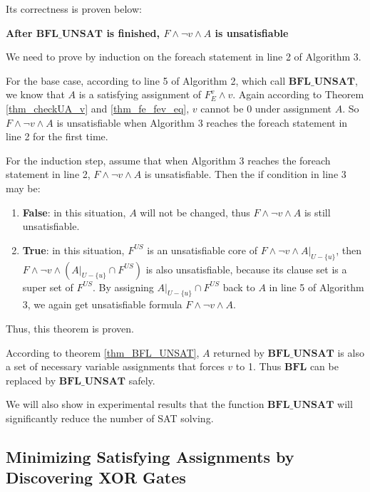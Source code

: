 \documentclass[journal]{IEEEtran}
\begin{document}
Its correctness is proven below:
\vspace{0.2cm}
\begin{theorem}[]\label{thm_BFL_UNSAT}
\textbf{After $\boldsymbol{BFL\_UNSAT}$ is finished, $F\wedge\neg v\wedge A$ is unsatisfiable}
\end{theorem}
\begin{IEEEproof}
We need to prove by induction on the foreach statement in line 2 of Algorithm 3.

For the base case,
according to line 5 of Algorithm 2,
which call $\boldsymbol{BFL\_UNSAT}$,
we know that $A$ is a satisfying assignment of $F_E^v\wedge v$.
Again according to Theorem \ref{thm_checkUA_v} and \ref{thm_fe_fev_eq},
$v$ cannot be 0 under assignment $A$.
So $F\wedge\neg v\wedge A$ is unsatisfiable
when Algorithm 3 reaches the foreach statement in line 2 for the first time.

For the induction step,
assume that when Algorithm 3 reaches the foreach statement in line 2,
$F\wedge\neg v\wedge A$ is unsatisfiable.
Then the if condition in line 3 may be:
\begin{enumerate}
\item \textbf{False}: in this situation,
$A$ will not be changed,
thus $F\wedge\neg v\wedge A$ is still unsatisfiable.

\item \textbf{True}: in this situation,
$F^{US}$ is an unsatisfiable core of $F\wedge\neg v\wedge A|_{U-\{u\}}$,
then $F\wedge\neg v\wedge (A|_{U-\{u\}}\cap F^{US})$ is also unsatisfiable,
because its clause set is a super set of $F^{US}$.
By assigning $A|_{U-\{u\}}\cap F^{US}$ back to $A$ in line 5 of Algorithm 3,
we again get unsatisfiable formula $F\wedge\neg v\wedge A$.
\end{enumerate}

Thus, this theorem is proven.
\end{IEEEproof}

According to theorem \ref{thm_BFL_UNSAT},
$A$ returned by $\boldsymbol{BFL\_UNSAT}$ is also a set of necessary variable assignments that forces $v$ to 1.
Thus $\boldsymbol{BFL}$ can be replaced by $\boldsymbol{BFL\_UNSAT}$ safely.

We will also show in experimental results that
the function $\boldsymbol{BFL\_UNSAT}$ will significantly reduce the number of SAT solving.

\subsection{Minimizing Satisfying Assignments by Discovering XOR Gates}\label{subsec_XOR}
\end{document}
